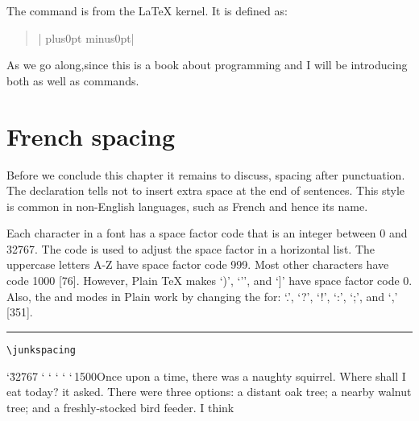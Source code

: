 The command  is from the LaTeX kernel. It is defined as: 
\begin{quote}
|\z@skip=0pt plus0pt minus0pt|
\end{quote}
As we go along,since this is a book about programming \tex and  \latex I will be introducing both \tex as well as \latex commands.





\section{French spacing}

Before we conclude this chapter it remains to discuss, spacing after punctuation. The \frenchspacing declaration tells \latex not to insert extra space at the end of sentences. This style is common in non-English languages, such as French and hence its name.

Each character in a font has a space factor  code that is an integer between 0 and 32767. The code is used to adjust the space factor in a horizontal list. The uppercase letters A-Z have space factor code 999. Most other characters have code 1000 [76]. However, Plain TeX makes `)', `'', and `]' have space factor code 0. Also, the  and  modes in Plain \tex work by changing the  for: `.', `?', `!', `:', `;', and `,' [351].

\begingroup
\def\junkspacing{\sfcode`\.32767 \sfcode`\?6000 \sfcode`\!3000
    \sfcode`\:2500 \sfcode`\;2000 \sfcode`\,1500}

\def\nonfrenchspacing{\sfcode`\.3000 \sfcode`\?3000 \sfcode`\!3000
   \sfcode`\:2000 \sfcode`\;1500 \sfcode`\,1250}

\def\frenchspacing{\sfcode`\.1000 \sfcode`\?1000 \sfcode`\!1000
   \sfcode`\:1000 \sfcode`\;1000 \sfcode`\,1000}


 \let\tstory\frogking

\bigskip

\noindent\rule{\linewidth}{0.4pt}

\medskip
\narrower
{\hfill\hfill\small \texttt{\textbackslash junkspacing}}
\medskip


 \junkspacing Once upon a time, there was a naughty squirrel. Where shall I eat
     today? it asked. There were three options: a distant oak tree; a nearby 
    walnut tree; and a freshly-stocked bird feeder. I think\par

